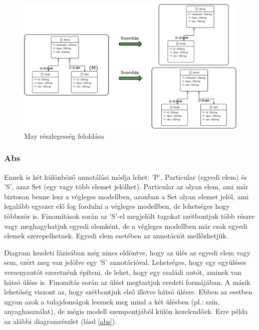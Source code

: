 \begin{figure}[htp]
	\centering
	\includegraphics[width=130mm]{figures/may.pdf}
	\caption{May részlegesség feloldása} 
	\label{may}
\end{figure}

\subsubsection{Abs}
Ennek is két különböző annotálási módja lehet: \textsf{’P’}, Particular (egyedi elem) és \textsf{’S’}, azaz Set (egy vagy több elemet jelölhet). Particular az olyan elem, ami már biztosan benne lesz a végleges modellben, azonban a Set olyan elemet jelöl, ami legalább egyszer elő fog fordulni a végleges modellben, de lehetséges hogy többször is. Finomítások során az \textsf{’S’}-el megjelölt tagokat szétbontjuk több részre vagy meghagyhatjuk egyedi elemként, de a végleges modellben már csak egyedi elemek szerepelhetnek. Egyedi elem esetében az annotációt mellőzhetjük.
\par
Diagram kezdeti fázisában még nincs eldöntve, hogy az ülés az egyedi elem vagy sem, ezért meg van jelölve egy \textsf{’S’} annotációval. Lehetséges, hogy egy együléses versenyautót szeretnénk építeni, de lehet, hogy egy családi autót, aminek van hátsó ülése is. Finomítás során az ülést megtartjuk eredeti formájában. A másik lehetőség viszont az, hogy szétbontjuk első illetve hátsó ülésre. Ebben az esetben ugyan azok a tulajdonságok lesznek meg mind a két ülésben (pl.: szín, anyaghasználat), de mégis modell szempontjából külön kezelendőek. Erre példa az alábbi diagramrészlet (lásd \autoref{abs}).


